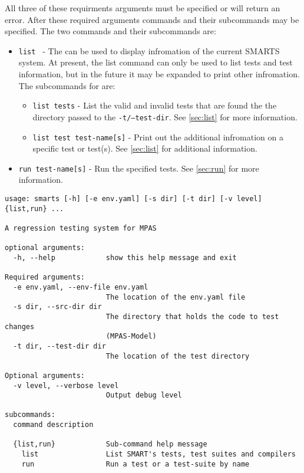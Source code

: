 All three of these requirments arguments must be specified or \smartspy will
return an error. After these required arguments commands and their subcommands
may be specified. The two commands and their subcommands are:

\begin{itemize}
    \item {\tt list } - The \listcmd can be used to display infromation of the
    current SMARTS system. At present, the list command can only be used to
    list tests and test information, but in the future it may be expanded
    to print other infromation. The subcommands for \listcmd are:
    \begin{itemize}
        \item {\tt list tests} - List the valid and invalid tests that are
        found the the directory passed to the {\tt -t/--test-dir}. See
        \ref{sec:list} for more information.
        \item {\tt list test test-name[s]} - Print out the additional
        infromation on a specific test or test(s). See \ref{sec:list} for
        additional information.
    \end{itemize}
    \item {\tt run test-name[s]} - Run the specified tests. See \ref{sec:run}
    for more information.
\end{itemize}

\begin{lstlisting}[language=Clean,
                   caption={smarts.py Help Message},
                   label=lst:smarts_help]
usage: smarts [-h] [-e env.yaml] [-s dir] [-t dir] [-v level] {list,run} ...

A regression testing system for MPAS

optional arguments:
  -h, --help            show this help message and exit

Required arguments:
  -e env.yaml, --env-file env.yaml
                        The location of the env.yaml file
  -s dir, --src-dir dir
                        The directory that holds the code to test changes
                        (MPAS-Model)
  -t dir, --test-dir dir
                        The location of the test directory

Optional arguments:
  -v level, --verbose level
                        Output debug level

subcommands:
  command description

  {list,run}            Sub-command help message
    list                List SMART's tests, test suites and compilers
    run                 Run a test or a test-suite by name
\end{lstlisting}

